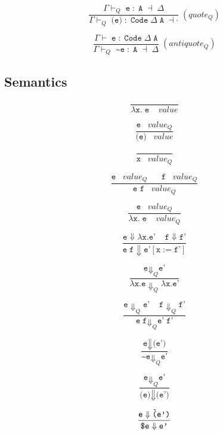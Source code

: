 \documentclass{article}
\begin{document}
$$
\frac
  {\Gamma \vdash_{Q} \; \texttt{e} \; : \; \texttt{A} \; \dashv \; \Delta}
  {\Gamma \vdash_{Q} \; \texttt{\`(e)} \; : \; \texttt{Code} \; \Delta \; \texttt{A} \; \dashv \cdot}
  \; (quote_{Q})
$$

$$
\frac
  {\Gamma \vdash \; \texttt{e} \; : \; \texttt{Code} \; \Delta \; \texttt{A}}
  {\Gamma \vdash_{Q} \; \texttt{\textasciitilde e} \; : \; \texttt{A} \; \dashv \; \Delta}
  \; (antiquote_Q)
$$

\subsection{Semantics}

$$
\frac{}{\lambda \texttt{x.} \; \texttt{e} \; \; \; \; value}
$$

$$
\frac{\texttt{e} \; \; \; value_{Q} }{\texttt{\`(e)} \; \; \; value}
$$

$$
\frac{}{\texttt{x} \; \; \; value_{Q}}
$$

$$
\frac{\texttt{e} \; \; \; value_{Q} \;\;\;\;\;\; \texttt{f} \;\;\; value_{Q}}{\texttt{e f} \; \; \; value_{Q}}
$$

$$
\frac{\texttt{e} \;\;\; value_{Q}}{\lambda \texttt{x.} \; \texttt{e} \; \; \; \; value_{Q}}
$$

$$
\frac
    {\texttt{e} \Downarrow \lambda \texttt{x.} \texttt{e'} \; \; \; \; \texttt{f} \Downarrow \texttt{f'}}
    {\texttt{e} \; \texttt{f} \Downarrow \texttt{e'}[\texttt{x} := \texttt{f'}]}
$$

$$
\frac
    {\texttt{e} \Downarrow_{Q} \texttt{e'}}
    {\lambda \texttt{x.} \texttt{e} \Downarrow_{Q} \lambda \texttt{x.} \texttt{e'}}
$$

$$
\frac
    {\texttt{e} \Downarrow_{Q} \texttt{e'} \;\;\;\; \texttt{f} \Downarrow_{Q} \texttt{f'}}
    {\texttt{e} \; \texttt{f} \Downarrow_{Q} \texttt{e'} \; \texttt{f'}}
$$

$$
\frac
    {\texttt{e} \Downarrow \texttt{\`(e')}}
    {\texttt{\textasciitilde} \texttt{e} \Downarrow_{Q} \texttt{e'}}
$$

$$
\frac
    {\texttt{e} \Downarrow_{Q} \texttt{e'}}
    {\texttt{\`(e)} \Downarrow \texttt{\`(e')}}
$$

$$
\frac
    {\texttt{e} \Downarrow \texttt{\`(e')}}
    {\texttt{\textdollar} \texttt{e} \Downarrow \texttt{e'}}
$$
\end{document}
